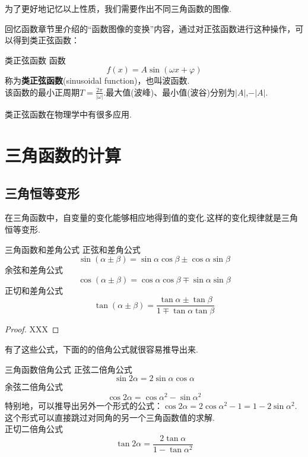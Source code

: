 \documentclass[lang=cn, zihao=4.5]{elegantbook}
\begin{document}
为了更好地记忆以上性质，我们需要作出不同三角函数的图像.


回忆函数章节里介绍的“函数图像的变换”内容，通过对正弦函数进行这种操作，可以得到类正弦函数：

\begin{definition}{类正弦函数}
    函数$$f(x)=A \sin (\omega x + \varphi)$$
    称为\textbf{类正弦函数}(sinusoidal function)，也叫波函数.\\
    该函数的最小正周期$T=\frac{2\pi}{|\omega|}$.最大值(波峰)、最小值(波谷)分别为$|A|$,$-|A|$.
\end{definition}

类正弦函数在物理学中有很多应用.

\section{三角函数的计算}

\subsection{三角恒等变形}

在三角函数中，自变量的变化能够相应地得到值的变化.这样的变化规律就是三角恒等变形.

\begin{theorem}{三角函数和差角公式} %
    正弦和差角公式$$\sin{(\alpha \pm \beta)}=\sin{\alpha}\cos{\beta} \pm \cos{\alpha}\sin{\beta}$$
    余弦和差角公式$$\cos{(\alpha \pm \beta)}=\cos{\alpha}\cos{\beta} \mp \sin{\alpha}\sin{\beta}$$
    正切和差角公式$$\tan{(\alpha \pm \beta)}=\frac{\tan{\alpha} \pm \tan{\beta}}{1 \mp \tan{\alpha}\tan{\beta}}$$
\end{theorem}
\begin{proof}
    XXX
\end{proof}

有了这些公式，下面的的倍角公式就很容易推导出来.

\begin{proposition}{三角函数倍角公式} %
    正弦二倍角公式$$\sin{2\alpha}=2\sin{\alpha}\cos{\alpha}$$
    余弦二倍角公式$$\cos{2\alpha}=\cos{\alpha ^2}-\sin{\alpha ^2}$$
    特别地，可以推导出另外一个形式的公式：$\cos{2\alpha}=2\cos{\alpha ^2}-1=1-2\sin{\alpha ^2}$.这个形式可以直接跳过对同角的另一个三角函数值的求解.\\
    正切二倍角公式$$\tan{2\alpha}=\frac{2\tan{\alpha}}{1-\tan{\alpha ^2}}$$
\end{proposition}
\end{document}

